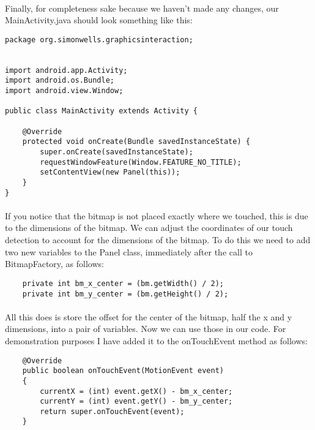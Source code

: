 \paragraph{} Finally, for completeness sake because we haven't made any changes, our MainActivity.java should look something like this:

\begin{lstlisting}
package org.simonwells.graphicsinteraction;


import android.app.Activity;
import android.os.Bundle;
import android.view.Window;

public class MainActivity extends Activity {

    @Override
    protected void onCreate(Bundle savedInstanceState) {
        super.onCreate(savedInstanceState);
        requestWindowFeature(Window.FEATURE_NO_TITLE);
        setContentView(new Panel(this));
    }
}
\end{lstlisting}

\paragraph{} If you notice that the bitmap is not placed exactly where we touched, this is due to the dimensions of the bitmap. We can adjust the coordinates of our touch detection to account for the dimensions of the bitmap. To do this we need to add two new variables to the Panel class, immediately after the call to BitmapFactory, as follows:

\begin{lstlisting}
    private int bm_x_center = (bm.getWidth() / 2);
    private int bm_y_center = (bm.getHeight() / 2);
\end{lstlisting}

\paragraph{} All this does is store the offset for the center of the bitmap, half the x and y dimensions, into a pair of variables. Now we can use those in our code. For demonstration purposes I have added it to the onTouchEvent method as follows:

\begin{lstlisting}
    @Override
    public boolean onTouchEvent(MotionEvent event)
    {
        currentX = (int) event.getX() - bm_x_center;
        currentY = (int) event.getY() - bm_y_center;
        return super.onTouchEvent(event);
    }
\end{lstlisting}

